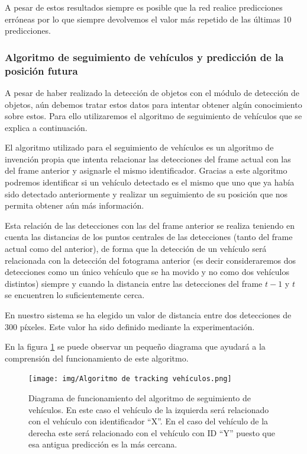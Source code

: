 A pesar de estos resultados siempre es posible que la red realice predicciones erróneas por lo que siempre devolvemos el valor más repetido de las últimas 10 predicciones.



\subsubsection{Algoritmo de seguimiento de vehículos y predicción de la posición futura} \label{sec:algoritmoSeguimiento}

A pesar de haber realizado la detección de objetos con el módulo de detección de objetos, aún debemos tratar estos datos para intentar obtener algún conocimiento sobre estos. Para ello utilizaremos el algoritmo de seguimiento de vehículos que se explica a continuación.

El algoritmo utilizado para el seguimiento de vehículos es un algoritmo de invención propia que intenta relacionar las detecciones del frame actual con las del frame anterior y asignarle el mismo identificador. 
Gracias a este algoritmo podremos identificar si un vehículo detectado es el mismo que uno que ya había sido detectado anteriormente y realizar un seguimiento de su posición que nos permita obtener aún más información.

Esta relación de las detecciones con las del frame anterior se realiza teniendo en cuenta las distancias de los puntos centrales de las detecciones (tanto del frame actual como del anterior), de forma que la detección de un vehículo será relacionada con la detección del fotograma anterior (es decir consideraremos dos detecciones como un único vehículo que se ha movido y no como dos vehículos distintos) siempre y cuando la distancia entre las detecciones del frame $t-1$ y $t$ se encuentren lo suficientemente cerca.

En nuestro sistema se ha elegido un valor de distancia entre dos detecciones de 300 píxeles. Este valor ha sido definido mediante la experimentación.

En la figura \ref{fig:trackingVehiculos} se puede observar un pequeño diagrama que ayudará a la comprensión del funcionamiento de este algoritmo.

\begin{figure}[h!]
    \centering
    \texttt{[image: img/Algoritmo de tracking vehículos.png]}
    \caption[Diagrama de funcionamiento del algoritmo de seguimiento de vehículos]{Diagrama de funcionamiento del algoritmo de seguimiento de vehículos. En este caso el vehículo de la izquierda será relacionado con el vehículo con identificador ``X''. En el caso del vehículo de la derecha este será relacionado con el vehículo con ID ``Y'' puesto que esa antigua predicción es la más cercana.}
    \label{fig:trackingVehiculos}    
\end{figure}


